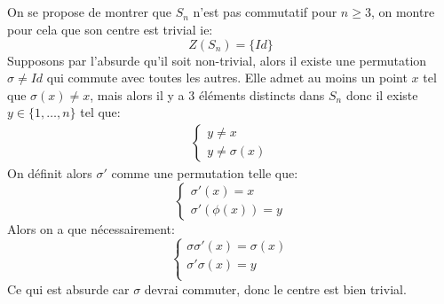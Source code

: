 \documentclass{report}
\begin{document}
      \subsection*{}
         On se propose de montrer que $S_n$ n'est pas commutatif pour $n \geq 3$, on montre pour cela que son centre est trivial ie:
         $$
            Z(S_n) = \{Id\}
         $$
         Supposons par l'absurde qu'il soit non-trivial, alors il existe une permutation $\sigma \neq Id$ qui commute avec toutes les autres. Elle admet au moins un point $x$ tel que $\sigma(x) \neq x$, mais alors il y a 3 éléments distincts dans $S_n$ donc il existe $y \in \{1, \ldots, n\}$ tel que:
         \begin{align*}
            \begin{cases}
               y \neq x\\
               y \neq \sigma(x)
            \end{cases}
         \end{align*}
         On définit alors $\sigma'$ comme une permutation telle que:
         $$
            \begin{cases}
               \sigma'(x) = x\\
               \sigma'(\phi(x)) = y
            \end{cases}
         $$
         Alors on a que nécessairement:
         $$
            \begin{cases}
               \sigma\sigma'(x) = \sigma(x)\\
               \sigma'\sigma(x) = y\\
            \end{cases}
         $$
         Ce qui est absurde car $\sigma$ devrai commuter, donc le centre est bien trivial.    
\end{document}
